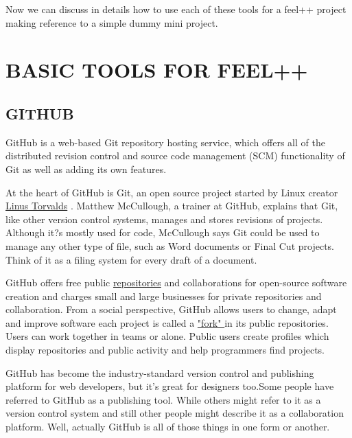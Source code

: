 \documentclass[11pt,utf8]{article}
\begin{document}
Now we can discuss in details how to use each of these tools for a feel++ project making reference to a simple dummy mini project.
\section{BASIC TOOLS FOR FEEL++}
\subsection{GITHUB}
GitHub is a web-based Git repository hosting service, which offers all of the distributed revision control and source code management (SCM) functionality of Git as well as adding its own features.

At the heart of GitHub is Git, an open source project started by Linux creator \href{https://en.wikipedia.org/wiki/Linus_Torvalds}{Linus Torvalds} . Matthew McCullough, a trainer at GitHub, explains that Git, like other version control systems, manages and stores revisions of projects. Although it?s mostly used for code, McCullough says Git could be used to manage any other type of file, such as Word documents or Final Cut projects. Think of it as a filing system for every draft of a document.

GitHub offers free public  \href{https://www.atlassian.com/git/tutorials/setting-up-a-repository/}{repositories} and collaborations for open-source software creation and charges small and large businesses for private repositories and collaboration. From a social perspective, GitHub allows users to change, adapt and improve software  each project is called a \href{https://help.github.com/articles/fork-a-repo/}{"fork" } in its public repositories. Users can work together in teams or alone. Public users create profiles which display repositories and public activity and help programmers find projects.

GitHub has become the industry-standard version control and publishing platform for web developers, but it's great for designers too.Some people have referred to GitHub as a publishing tool. While others might refer to it as a version control system and still other people might describe it as a collaboration platform. Well, actually GitHub is all of those things in one form or another.
\end{document}
